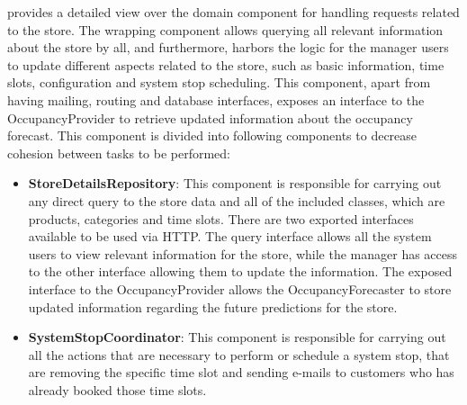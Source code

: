  provides a detailed view over the domain component for handling requests related to the store.
The wrapping component allows querying all relevant information about the store by all, and furthermore, harbors the logic for the manager users to update different aspects related to the store, such as basic information, time slots, configuration and system stop scheduling.
This component, apart from having mailing, routing and database interfaces, exposes an interface to the OccupancyProvider to retrieve updated information about the occupancy forecast. %
This component is divided into following components to decrease cohesion between tasks to be performed:
\begin{itemize}
    \item \textbf{StoreDetailsRepository}: This component is responsible for carrying out any direct query to the store data and all of the included classes, which are products, categories and time slots.
    There are two exported interfaces available to be used via HTTP.
    The query interface allows all the system users to view relevant information for the store, while the manager has access to the other interface allowing them to update the information.
    The exposed interface to the OccupancyProvider allows the OccupancyForecaster to store updated information regarding the future predictions for the store.
    \item \textbf{SystemStopCoordinator}: This component is responsible for carrying out all the actions that are necessary to perform or schedule a system stop, that are removing the specific time slot and sending e-mails to customers who has already booked those time slots.
\end{itemize}

